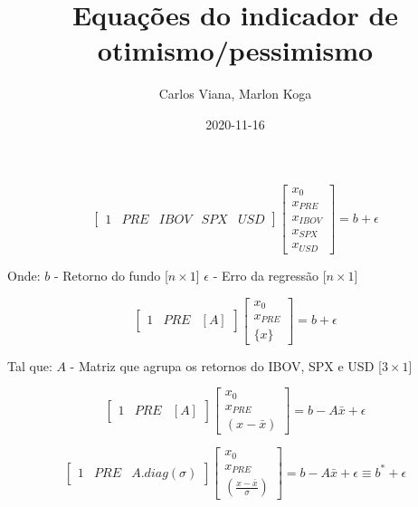 \documentclass[11pt, letterpaper]{article}
\title{Equações do indicador de otimismo/pessimismo}
\author{Carlos Viana, Marlon Koga}
\date{2020-11-16}
\begin{document}
	\begin{titlepage}
	\maketitle
	\end{titlepage}
	
	\begin{equation}
		\begin{bmatrix}
			1 & PRE & IBOV & SPX & USD
		\end{bmatrix}
		\begin{bmatrix}
			x_0 \\
			x_{PRE} \\
			x_{IBOV} \\
			x_{SPX} \\
			x_{USD}
		\end{bmatrix} = b + \epsilon
	\end{equation}

	Onde:	\newline
		$b$ - Retorno do fundo [$n \times 1$] \newline 
		$\epsilon$ - Erro da regressão [$n \times 1$]

	\begin{equation}
		\begin{bmatrix}
			1 & PRE & [A]
		\end{bmatrix}
		\begin{bmatrix}
			x_0 \\
			x_{PRE} \\
			\{x\}
		\end{bmatrix} = b + \epsilon
	\end{equation}

	Tal que:	\newline
		$A$ - Matriz que agrupa os retornos do IBOV, SPX e USD [$3 \times 1$] \newline 

	\begin{equation}
		\begin{bmatrix}
			1 & PRE & [A]
		\end{bmatrix}
		\begin{bmatrix}
			x_0 \\
			x_{PRE} \\
			(x-\bar{x})
		\end{bmatrix} = b - A \bar{x}+ \epsilon
	\end{equation}

	\begin{equation}
		\begin{bmatrix}
			1 & PRE & A.diag(\sigma)
		\end{bmatrix}
		\begin{bmatrix}
			x_0 \\
			x_{PRE} \\
			\left(\frac{x-\bar{x}}{\sigma}\right)
		\end{bmatrix} = b - A \bar{x}+ \epsilon \equiv  b^* + \epsilon
	\end{equation}
\end{document}
